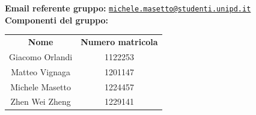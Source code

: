 \begin{center}
	\textbf{Email referente gruppo:}
	\texttt{\href{mailto:michele.masetto@studenti.unipd.it}{michele.masetto@studenti.unipd.it}}\\
	\bigskip
	\bigskip
	\textbf{Componenti del gruppo:}\\
	\bigskip
	\begin{tabular}{c | c}
		\textbf{Nome} & \textbf{Numero matricola}\\
		Giacomo Orlandi & 1122253\\
		Matteo Vignaga & 1201147\\
		Michele Masetto & 1224457\\
		Zhen Wei Zheng & 1229141\\
	\end{tabular}
	\vspace{0.7cm}
\end{center}